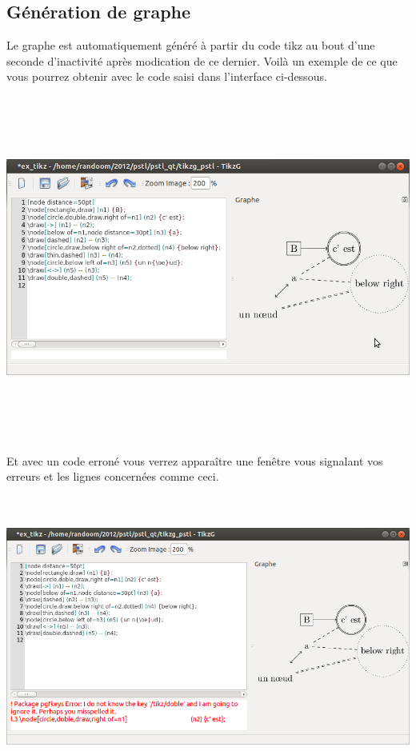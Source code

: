 \documentclass[a4paper]{report}
\begin{document}
\subsection{Génération de graphe}
Le graphe est automatiquement généré à partir du code tikz au bout d'une seconde d'inactivité après modication de ce dernier. Voilà un exemple de ce que vous pourrez obtenir avec le code saisi dans l'interface ci-dessous.
\\ \\ \\
\includegraphics[width=15cm, height=10cm]{img/r_1.png} \\ \\ \\
Et avec un code erroné vous verrez apparaître une fenêtre vous signalant vos erreurs et les lignes concernées comme ceci.
\\
\includegraphics[width=15cm, height=10cm]{img/r_2.png} \\ \\ \\
\end{document}
